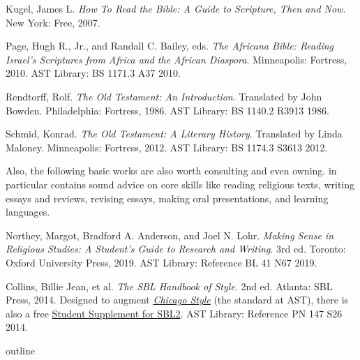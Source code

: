 \documentclass[titlepage]{article}
\begin{document}
\begin{thebibliography}{99}
	 Kugel, James L.
	\emph{How To Read the Bible: A Guide to Scripture, Then and Now}.
	New York: Free, 2007.

	 Page, Hugh R., Jr., and Randall C. Bailey, eds.
	\emph{The Africana Bible: Reading Israel’s Scriptures from Africa and the African Diaspora}.
	Minneapolis: Fortress, 2010.
	AST Library: BS 1171.3 A37 2010.

	 Rendtorff, Rolf.
	\emph{The Old Testament: An Introduction}. Translated by John Bowden.
	Philadelphia: Fortress, 1986.
	AST Library: BS 1140.2 R3913 1986.

	 Schmid, Konrad.
	\emph{The Old Testament: A Literary History}. Translated by Linda Maloney.
	Minneapolis: Fortress, 2012.
	AST Library: BS 1174.3 S3613 2012.

\end{thebibliography}
\endgroup

Also, the following basic works are also worth consulting and even owning.
\cite{rlgs} in particular contains sound advice on core skills like
reading religious texts, writing essays and reviews, revising essays,
making oral presentations, and learning languages.

\begingroup
\renewcommand{\section}[2]{}%
\begin{thebibliography}{Making}%

	 Northey, Margot, Bradford A. Anderson, and Joel N. Lohr.
	\emph{Making Sense in Religious Studies: A Student's Guide to Research and Writing}.
	3rd ed. Toronto: Oxford University Press, 2019. AST Library: Reference BL 41 N67 2019.

	 Collins, Billie Jean, et al.
	\emph{The SBL Handbook of Style}.
	2nd ed. Atlanta: SBL Press, 2014.
	Designed to augment \href{https://proxy.openathens.net/login?qurl=https%3A%2F%2Fwww.chicagomanualofstyle.org%2Fbook%2Fed17%2Ffrontmatter%2Ftoc.html}{\emph{Chicago Style}}
	(the standard at AST), there is also a free
	\href{https://www.sbl-site.org/assets/pdfs/pubs/SBLHSsupp2015-02.pdf}{Student Supplement for SBL2}. AST Library: Reference PN 147 S26 2014.

\end{thebibliography}
\endgroup


\section{Course Outline}
\label{outline}
\end{document}

